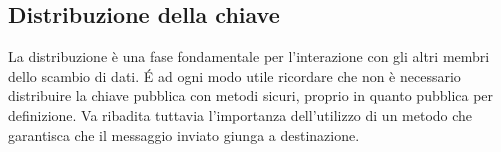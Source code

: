 \subsection{Distribuzione della chiave}
La distribuzione è una fase fondamentale per l'interazione con gli altri membri dello scambio di dati. \'E ad ogni modo utile ricordare che non è necessario distribuire la chiave pubblica con metodi sicuri, proprio in quanto pubblica per definizione. Va ribadita tuttavia l'importanza dell'utilizzo di un metodo che garantisca che il messaggio inviato giunga a destinazione.